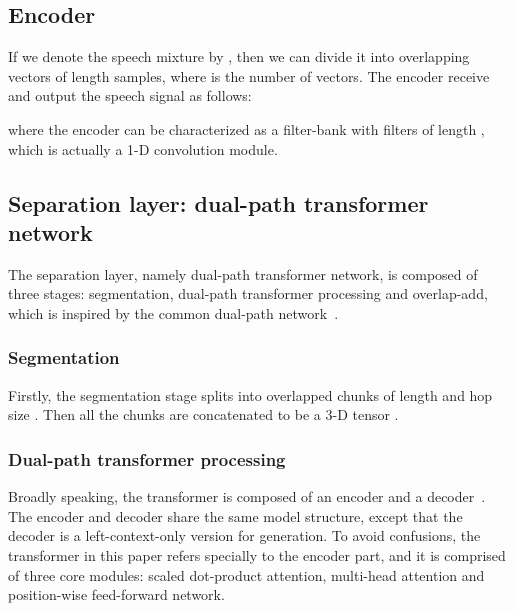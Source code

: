 \documentclass[a4paper]{article}
\begin{document}
\subsection{Encoder}

If we denote the speech mixture by , then we can divide it into overlapping vectors  of length  samples, where  is the number of vectors. The encoder receive  and output the speech signal  as follows:

where the encoder can be characterized as a filter-bank  with  filters of length , which is actually a 1-D convolution module.

\subsection{Separation layer: dual-path transformer network}

The separation layer, namely dual-path transformer network, is composed of three stages: segmentation, dual-path transformer processing and overlap-add, which is inspired by the common dual-path network~\cite{luo2019dual}.

\subsubsection{Segmentation}
Firstly, the segmentation stage splits  into overlapped chunks of length  and hop size . Then all the chunks are concatenated to be a 3-D tensor .

\subsubsection{Dual-path transformer processing}

Broadly speaking,
the transformer is composed of an encoder and a decoder~\cite{vaswani2017attention}. The encoder and decoder share the same model structure, except that the decoder is a left-context-only version for generation. To avoid confusions, the transformer in this paper refers specially to the encoder part, and it is comprised of three core modules: scaled dot-product attention, multi-head attention and position-wise feed-forward network.
\end{document}
